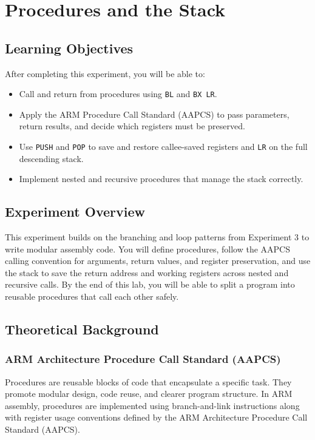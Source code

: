 \chapter{Procedures and the Stack}

\section*{Learning Objectives}
After completing this experiment, you will be able to:
\begin{itemize}[nosep]
  \item Call and return from procedures using \texttt{BL} and \texttt{BX LR}.
  \item Apply the ARM Procedure Call Standard (AAPCS) to pass parameters, return results, and decide which registers must be preserved.
  \item Use \texttt{PUSH} and \texttt{POP} to save and restore callee-saved registers and \texttt{LR} on the full descending stack.
  \item Implement nested and recursive procedures that manage the stack correctly.
\end{itemize}

\section*{Experiment Overview}
This experiment builds on the branching and loop patterns from Experiment 3 to write modular assembly code. You will define procedures, follow the AAPCS calling convention for arguments, return values, and register preservation, and use the stack to save the return address and working registers across nested and recursive calls. By the end of this lab, you will be able to split a program into reusable procedures that call each other safely.

\newpage

\section{Theoretical Background}
\subsection{ARM Architecture Procedure Call Standard (AAPCS)}

Procedures are reusable blocks of code that encapsulate a specific task. They promote modular design, code reuse, and clearer program structure. In ARM assembly, procedures are implemented using branch-and-link instructions along with register usage conventions defined by the ARM Architecture Procedure Call Standard (AAPCS).

